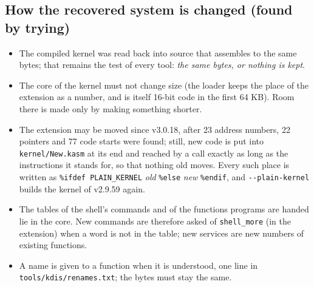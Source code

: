 \documentclass[11pt,a4paper]{article}
\newcommand{\file}[1]{\texttt{#1}}
\newcommand{\cmd}[1]{\texttt{#1}}
\begin{document}
\subsection{How the recovered system is changed (found by trying)}
\begin{itemize}
\item The compiled kernel was read back into source that assembles to the same bytes; that
      remains the test of every tool: \emph{the same bytes, or nothing is kept}.
\item The core of the kernel must not change size (the loader keeps the place of the
      extension as a number, and is itself 16-bit code in the first 64 KB). Room there is
      made only by making something shorter.
\item The extension may be moved since v3.0.18, after 23 address numbers, 22 pointers and 77
      code starts were found; still, new code is put into \file{kernel/New.kasm} at its end
      and reached by a call exactly as long as the instructions it stands for, so that
      nothing old moves. Every such place is written as
      \texttt{\%ifdef PLAIN\_KERNEL} \emph{old} \texttt{\%else} \emph{new} \texttt{\%endif},
      and \cmd{-{}-plain-kernel} builds the kernel of v2.9.59 again.
\item The tables of the shell's commands and of the functions programs are handed lie in the
      core. New commands are therefore asked of \texttt{shell\_more} (in the extension) when a
      word is not in the table; new services are new numbers of existing functions.
\item A name is given to a function when it is understood, one line in
      \file{tools/kdis/renames.txt}; the bytes must stay the same.
\end{itemize}
\end{document}
